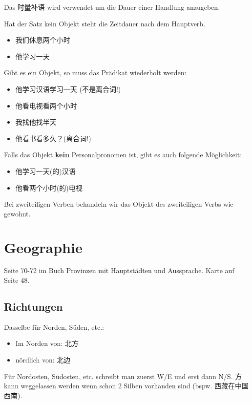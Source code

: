 \documentclass[UTF8]{ctexart}
\begin{document}
Das 时量补语 wird verwendet um die Dauer einer Handlung anzugeben.

Hat der Satz kein Objekt steht die Zeitdauer nach dem Hauptverb.

\begin{itemize}
    \item 我们休息两个小时
    \item 他学习一天
\end{itemize}

Gibt es ein Objekt, so muss das Prädikat wiederholt werden:

\begin{itemize}
    \item 他学习汉语学习一天 (不是离合词!)
    \item 他看电视看两个小时
    \item 我找他找半天
    \item 他看书看多久？(离合词!)
\end{itemize}

Falls das Objekt \textbf{kein} Personalpronomen ist, gibt es auch folgende Möglichkeit:

\begin{itemize}
    \item 他学习一天(的)汉语
    \item 他看两个小时(的)电视
\end{itemize}

Bei zweiteiligen Verben behandeln wir das Objekt des zweiteiligen Verbs wie gewohnt.

\section{Geographie}

Seite 70-72 im Buch Provinzen mit Hauptstädten und Aussprache. Karte auf Seite 48.


\subsection{Richtungen}

Dasselbe für Norden, Süden, etc.:

\begin{itemize}
    \item Im Norden von: 北方
    \item nördlich von: 北边
\end{itemize}

Für Nordosten, Südosten, etc. schreibt man zuerst W/E und erst dann N/S. 方 kann weggelassen werden wenn schon 2 Silben vorhanden sind (bspw. 西藏在中国西南).
\end{document}

